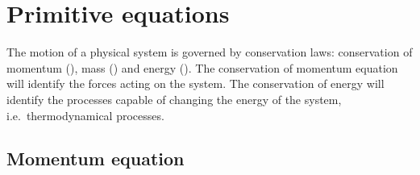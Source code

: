 \section{Primitive equations}
\label{sec:primitive-equations}

The motion of a physical system is governed by conservation laws: conservation of momentum (\eq{\ref{eq:momentum-eq-atm}}),
mass (\eq{\ref{eq:continuity-equation}}) and energy (\eq{\ref{eq:thermal-energy-conservation}}).
The conservation of momentum equation will identify the forces acting on the system.
The conservation of energy will identify the processes capable of changing the energy of the system, i.e.~thermodynamical processes.

\subsection{Momentum equation}
\label{subsec:momentum-equation-atm}

